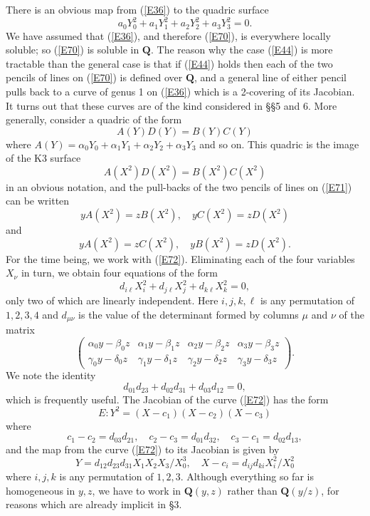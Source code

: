 \documentclass[12pt]{article}
\def\bQ{{\mathbf Q}}
\def\ga{{\alpha}}
\def\gb{{\beta}}
\def\gg{{\gamma}}
\def\gd{{\delta}}
\def\beq{\begin{equation} \label}
\begin{document}
There is an obvious map from (\ref{E36}) to the quadric surface
\beq{E70} a_0Y_0^2+a_1Y_1^2+a_2Y_2^2+a_3Y_3^2=0. \end{equation}
We have assumed that (\ref{E36}), and therefore (\ref{E70}),
is everywhere locally soluble; so (\ref{E70}) is soluble in
$\bQ$.
The reason why the case (\ref{E44}) is more tractable than
the general case is that if (\ref{E44}) holds then each of
the two pencils of lines on (\ref{E70}) is defined over $\bQ$,
and a general line of either pencil pulls back to a curve of
genus 1 on (\ref{E36}) which is a 2-covering of its Jacobian.
It turns out that these curves are of the kind considered in
\S\S5 and 6. More generally,
consider a quadric of the form
\beq{E71} A(Y)D(Y)=B(Y)C(Y) \end{equation}
where $A(Y)=\ga_0Y_0+\ga_1Y_1+\ga_2Y_2+\ga_3Y_3$ and so on.
This quadric is the image of the K3 surface
\beq{E75} A(X^2)D(X^2)=B(X^2)C(X^2) \end{equation}
in an obvious notation, and the pull-backs of the two pencils
of lines on (\ref{E71}) can be written
\beq{E72} yA(X^2)=zB(X^2), \quad yC(X^2)=zD(X^2) \end{equation}
and
\beq{E73} yA(X^2)=zC(X^2), \quad yB(X^2)=zD(X^2). \end{equation}
For the time being, we work with (\ref{E72}). Eliminating each
of the four
variables $X_\nu$ in turn, we obtain four equations of the form
\beq{E74} d_{i\ell}X_i^2+d_{j\ell}X_j^2+d_{k\ell}X_k^2=0, \end{equation}
only two of which are linearly independent. Here $i,j,k,\ell$
is any permutation of $1,2,3,4$ and $d_{\mu\nu}$ is the value
of the determinant
formed by columns $\mu$ and $\nu$ of the matrix
\[ \begin{pmatrix}
\ga_0y-\gb_0z & \ga_1y-\gb_1z & \ga_2y-\gb_2z & \ga_3y-\gb_3z \\
\gg_0y-\gd_0z & \gg_1y-\gd_1z & \gg_2y-\gd_2z & \gg_3y-\gd_3z
\end{pmatrix}. \]
We note the identity
\[ d_{01}d_{23}+d_{02}d_{31}+d_{03}d_{12}=0, \]
which is frequently useful. The Jacobian of the curve
(\ref{E72}) has the form
\[ E:Y^2=(X-c_1)(X-c_2)(X-c_3) \]
where
\[ c_1-c_2=d_{03}d_{21}, \quad c_2-c_3=d_{01}d_{32},
\quad c_3-c_1=d_{02}d_{13}, \]
and the map from the curve (\ref{E72}) to its Jacobian is
given by
\[ Y=d_{12}d_{23}d_{31}X_1X_2X_3/X_0^3, \quad X-c_i=d_{ij}d_{ki}X_i^2/X_0^2 \]
where $i,j,k$ is any permutation of $1,2,3$. Although
everything so far is homogeneous in $y,z$, we have to work in
$\bQ(y,z)$ rather than $\bQ(y/z)$, for reasons which are
already implicit in \S3.
\end{document}
